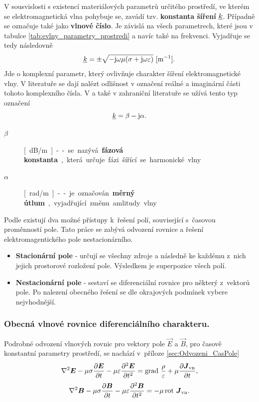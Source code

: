V sousvislosti s existencí materiálových parametrů určitého prostředí, ve kterém se elektromagnetická vlna pohybuje se, zavádí tzv. {\bf konstanta šíření} ${\underline{k}}$. Případně se označuje také jako {\bf vlnové číslo}. Je závislá na všech parametrech, které jsou v tabulce \ref{tab:evlny_parametry_prostredi} a navíc také na frekvenci. Vyjadřuje se tedy následovně
\begin{displaymath}
	{\underline{k}}=\pm\sqrt{-\mathrm{j}\omega\mu(\sigma+\mathrm{j}\omega\varepsilon)}\mathrm{\ [m^{-1}]}.
\end{displaymath}
Jde o komplexní parametr, který ovlivňuje charakter šíření elektromagnetické vlny. V literatuře se dají nalézt odlišnost v označení reálné a imaginární  části tohoto komplexního čísla. V \cite{emp} a také v zahraniční literatuře se užívá tento typ označení 
\begin{equation}
	{\underline{k}} = \beta - \mathrm{j}\alpha.
	\label{rce:evlny_alphabeta}
\end{equation}
\begin{description}
\item[$\beta$]\unit[dB/m]-- se nazývá {\bf fázová konstanta}, která určuje fázi šířící se harmonické vlny
\item[$\alpha$]\unit[rad/m] -- je označován {\bf měrný útlum}, vyjadřující změnu amlitudy vlny
\end{description}

Podle \cite[str. 33]{emp} existují dva možné přístupy k~řešení polí, související s~časovou proměnností pole. Tato práce se zabývá odvození rovnice a řešení elektromagentického pole nestacionárního.
\begin{itemize}
\item {\bf Stacionární pole} - určují se všechny zdroje a následně ke každému z~nich jejich prostorové rozložení pole. Výsledkem je superpozice všech polí.
\item {\bf Nestacionární pole} - sestaví se diferenciální rovnice pro některý z~vektorů pole. Po nalezení obecného řešení se dle okrajových podmínek vybere nejvhodnější. 
\end{itemize}


\subsubsection*{Obecná vlnové rovnice diferenciálního charakteru.}
 Podrobné odvození vlnových rovnic pro vektory pole $\vec E$ a $\vec B$, pro časově konstantní parametry prostředí, se nachází v~příloze \ref{sec:Odvozeni_CasPole}
\begin{equation}
	\nabla^{2}\mbox{\boldmath$E$} -\mu\sigma\frac{\partial\mbox{\boldmath$E$}}{\partial t}-\mu\varepsilon\frac{\partial^{2}\mbox{\boldmath$E$}}{\partial t^{2}} = \mathrm{grad}\ \frac{\rho}{\varepsilon}+\mu\frac{\partial\mbox{\boldmath$J$}_{\mathrm{vn}}}{\partial t},
	\label{rce:evlny_VlnR_ElPole}
\end{equation}
\begin{equation}
	\nabla^{2}\mbox{\boldmath$B$} -\mu\sigma\frac{\partial\mbox{\boldmath$B$}}{\partial t}-\mu\varepsilon\frac{\partial^{2}\mbox{\boldmath$B$}}{\partial t^{2}}= -\mu\,\mathrm{rot}\ \mbox{\boldmath$J$}_{\mathrm{vn}}.
	\label{rce:evlny_VlnR_MagPole}
\end{equation}

